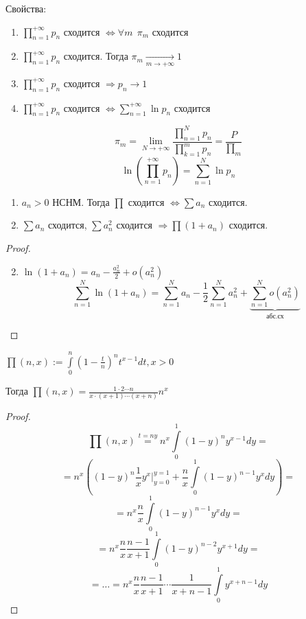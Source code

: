 Свойства:
\begin{enumerate}
    \item $\prod\limits_{n=1}^{+\infty} p_n$ сходится $\Leftrightarrow \forall m \ \ \pi_m$ сходится
    \item $\prod\limits_{n=1}^{+\infty} p_n$ сходится. Тогда $\pi_m\xrightarrow[m\to+\infty]{}1$
    \item $\prod\limits_{n=1}^{+\infty} p_n$ сходится $\Rightarrow p_n\to1$
    \item $\prod\limits_{n=1}^{+\infty} p_n$ сходится $\Leftrightarrow \sum\limits_{n=1}^{+\infty} \ln p_n$ сходится
\end{enumerate}

$$\pi_m = \lim_{N\to+\infty}\frac{\prod\limits_{n=1}^N p_n}{\prod\limits_{k=1}^m p_n}=\frac{P}{\prod_m}$$
$$\ln\left(\prod\limits_{n=1}^{+\infty} p_n\right)=\sum_{n=1}^N \ln p_n$$

\begin{theorem}
    \begin{enumerate}
        \item $a_n>0$ НСНМ. Тогда $\prod$ сходится $\Leftrightarrow \sum a_n$ сходится.
        \item $\sum a_n$ сходится, $\sum a_n^2$ сходится $\Rightarrow \prod(1+a_n)$ сходится.
    \end{enumerate}
\end{theorem}

\begin{proof}
    \begin{enumerate}
        \setcounter{enumi}{1}
        \item $\ln(1+a_n)=a_n-\frac{a_n^2}{2}+o(a_n^2)$
        $$\sum_{n=1}^N \ln(1+a_n)=\sum_{n=1}^N a_n - \frac{1}{2}\sum_{n=1}^N a_n^2 + \underbrace{\sum_{n=1}^N o(a_n^2)}_{\text{абс.сх}}$$
    \end{enumerate}
\end{proof}

\begin{lemma}
    $\prod(n, x) := \int\limits_0^n \left(1-\frac{t}{n}\right)^n t^{x-1}dt, x>0$

    Тогда $\prod(n, x) = \frac{1\cdot2\cdots n}{x\cdot(x+1)\cdots(x+n)}n^x$
\end{lemma}
\begin{proof}
    $$\prod(n, x)\stackrel{t=ny}{=}n^x\int\limits_0^1 (1-y)^ny^{x-1}dy=$$
    $$=n^x\left((1-y)^n\frac{1}{x}y^x\Bigg|_{y=0}^{y=1} + \frac{n}{x} \int\limits_0^1 (1-y)^{n-1} y^x dy \right)=$$
    $$=n^x\frac{n}{x}\int\limits_0^1 (1-y)^{n-1} y^x dy=$$
    $$=n^x\frac{n}{x}\frac{n-1}{x+1}\int\limits_0^1 (1-y)^{n-2} y^{x+1} dy=$$
    $$=\ldots=n^x\frac{n}{x}\frac{n-1}{x+1}\cdots\frac{1}{x+n-1}\int\limits_0^1 y^{x+n-1} dy$$
\end{proof}


